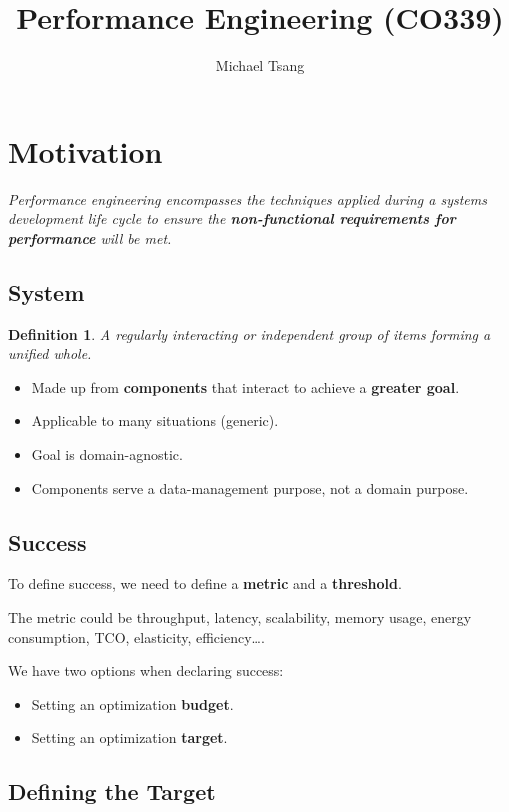 \documentclass[11pt]{article}
\title{Performance Engineering (CO339)}
\author{Michael Tsang}
\newtheorem{defn}{Definition}
\begin{document}
\maketitle

\section{Motivation}
\textit{Performance engineering encompasses the techniques applied during a systems development life cycle to ensure the \textbf{non-functional requirements for performance} will be met.}

\subsection{System}
\begin{defn}
  A regularly interacting or independent group of items forming a unified whole.
\end{defn}

\begin{itemize}
  \item Made up from \textbf{components} that interact to achieve a \textbf{greater goal}.
  \item Applicable to many situations (generic).
  \item Goal is domain-agnostic.
  \item Components serve a data-management purpose, not a domain purpose.
\end{itemize}

\subsection{Success}
To define success, we need to define a \textbf{metric} and a \textbf{threshold}.

The metric could be throughput, latency, scalability, memory usage, energy consumption, TCO, elasticity, efficiency\dots.

We have two options when declaring success:
\begin{itemize}
  \item Setting an optimization \textbf{budget}.
  \item Setting an optimization \textbf{target}.
\end{itemize}

\subsection{Defining the Target}
\end{document}
